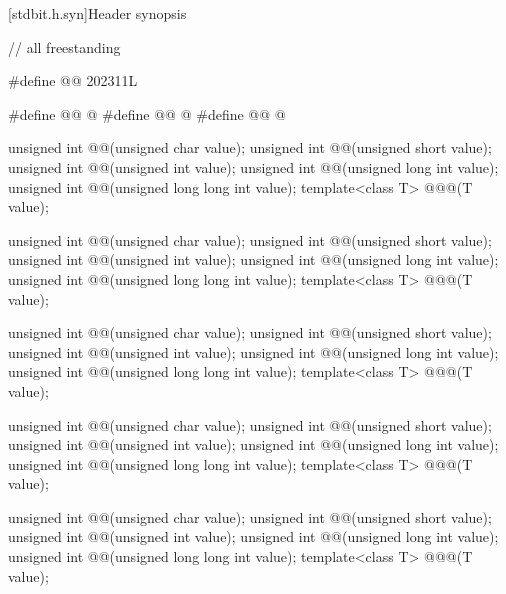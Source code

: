 [stdbit.h.syn]{Header  synopsis}

%
\begin{codeblock}
// all freestanding

#define @@ 202311L

#define @@     @\seebelow@
#define @@  @\seebelow@
#define @@  @\seebelow@

unsigned int @@(unsigned char value);
unsigned int @@(unsigned short value);
unsigned int @@(unsigned int value);
unsigned int @@(unsigned long int value);
unsigned int @@(unsigned long long int value);
template<class T> @\seebelow@ @@(T value);

unsigned int @@(unsigned char value);
unsigned int @@(unsigned short value);
unsigned int @@(unsigned int value);
unsigned int @@(unsigned long int value);
unsigned int @@(unsigned long long int value);
template<class T> @\seebelow@ @@(T value);

unsigned int @@(unsigned char value);
unsigned int @@(unsigned short value);
unsigned int @@(unsigned int value);
unsigned int @@(unsigned long int value);
unsigned int @@(unsigned long long int value);
template<class T> @\seebelow@ @@(T value);

unsigned int @@(unsigned char value);
unsigned int @@(unsigned short value);
unsigned int @@(unsigned int value);
unsigned int @@(unsigned long int value);
unsigned int @@(unsigned long long int value);
template<class T> @\seebelow@ @@(T value);

unsigned int @@(unsigned char value);
unsigned int @@(unsigned short value);
unsigned int @@(unsigned int value);
unsigned int @@(unsigned long int value);
unsigned int @@(unsigned long long int value);
template<class T> @\seebelow@ @@(T value);


\end{codeblock}
